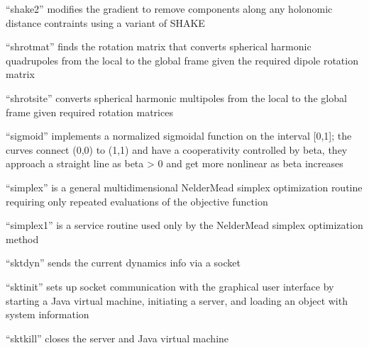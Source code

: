 \documentclass[letterpaper,11pt,english]{sphinxmanual}
\begin{document}
\sphinxAtStartPar
{}

\sphinxAtStartPar
“shake2” modifies the gradient to remove components along any holonomic distance contraints using a variant of SHAKE

\sphinxAtStartPar
{}

\sphinxAtStartPar
“shrotmat” finds the rotation matrix that converts spherical harmonic quadrupoles from the local to the global frame given the required dipole rotation matrix

\sphinxAtStartPar
{}

\sphinxAtStartPar
“shrotsite” converts spherical harmonic multipoles from the local to the global frame given required rotation matrices

\sphinxAtStartPar
{}

\sphinxAtStartPar
“sigmoid” implements a normalized sigmoidal function on the interval {[}0,1{]}; the curves connect (0,0) to (1,1) and have a cooperativity controlled by beta, they approach a straight line as beta \sphinxhyphen{}\textgreater{} 0 and get more nonlinear as beta increases

\sphinxAtStartPar
{}

\sphinxAtStartPar
“simplex” is a general multidimensional Nelder\sphinxhyphen{}Mead simplex optimization routine requiring only repeated evaluations of the objective function

\sphinxAtStartPar
{}

\sphinxAtStartPar
“simplex1” is a service routine used only by the Nelder\sphinxhyphen{}Mead simplex optimization method

\sphinxAtStartPar
{}

\sphinxAtStartPar
“sktdyn” sends the current dynamics info via a socket

\sphinxAtStartPar
{}

\sphinxAtStartPar
“sktinit” sets up socket communication with the graphical user interface by starting a Java virtual machine, initiating a server, and loading an object with system information

\sphinxAtStartPar
{}

\sphinxAtStartPar
“sktkill” closes the server and Java virtual machine
\end{document}
